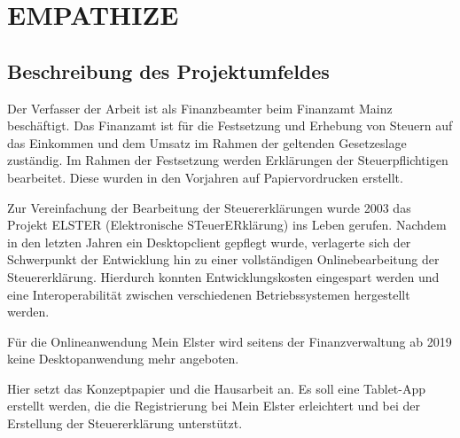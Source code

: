 


\section{EMPATHIZE}\label{EMPATHIZE}
\subsection{Beschreibung des Projektumfeldes}\label{Beschreibung des Projektumfeldes}
Der Verfasser der Arbeit ist als Finanzbeamter beim Finanzamt Mainz beschäftigt.
Das Finanzamt ist für die Festsetzung und Erhebung von Steuern auf das Einkommen und dem Umsatz im Rahmen der geltenden Gesetzeslage zuständig. Im Rahmen der Festsetzung werden Erklärungen der Steuerpflichtigen bearbeitet. Diese wurden in den Vorjahren auf Papiervordrucken erstellt. 

Zur Vereinfachung der Bearbeitung der Steuererklärungen wurde 2003 das Projekt ELSTER (\grq{}Elektronische STeuerERklärung\grq{}) ins Leben gerufen. Nachdem in den letzten Jahren ein Desktopclient gepflegt wurde, verlagerte sich der Schwerpunkt der Entwicklung hin zu einer vollständigen Onlinebearbeitung der Steuererklärung. Hierdurch konnten Entwicklungskosten eingespart werden und eine Interoperabilität zwischen verschiedenen Betriebssystemen hergestellt werden.

Für die Onlineanwendung \grq{}Mein Elster\grq{} wird seitens der Finanzverwaltung ab 2019 keine Desktopanwendung mehr angeboten. 

Hier setzt das Konzeptpapier und die Hausarbeit an. Es soll eine Tablet-App erstellt werden, die die Registrierung bei \grq{}Mein Elster\grq{} erleichtert und bei der Erstellung der Steuererklärung unterstützt.




